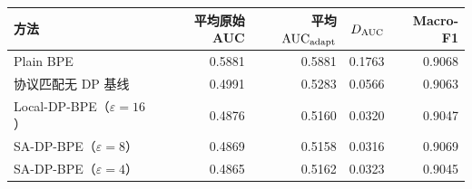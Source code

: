 \begin{tabular}{lrrrr}
\toprule
方法 & 平均原始AUC & 平均$\mathrm{AUC}_{\rm adapt}$ & $D_{\rm AUC}$ & Macro-F1 \\
\midrule
Plain BPE & 0.5881 & 0.5881 & 0.1763 & 0.9068 \\
协议匹配无 DP 基线 & 0.4991 & 0.5283 & 0.0566 & 0.9063 \\
Local-DP-BPE（$\varepsilon=16$） & 0.4876 & 0.5160 & 0.0320 & 0.9047 \\
SA-DP-BPE（$\varepsilon=8$） & 0.4869 & 0.5158 & 0.0316 & 0.9069 \\
SA-DP-BPE（$\varepsilon=4$） & 0.4865 & 0.5162 & 0.0323 & 0.9045 \\
\bottomrule
\end{tabular}
